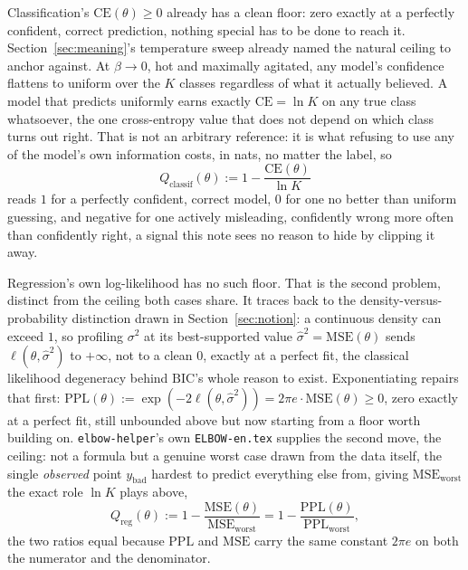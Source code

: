 \documentclass[11pt]{article}
\newcommand{\code}[1]{\texttt{#1}}
\begin{document}
Classification's $\mathrm{CE}(\theta) \ge 0$ already has a clean floor:
zero exactly at a perfectly confident, correct prediction, nothing
special has to be done to reach it. Section~\ref{sec:meaning}'s
temperature sweep already named the natural ceiling to anchor against.
At $\beta \to 0$, hot and maximally agitated, any model's confidence
flattens to uniform over the $K$ classes regardless of what it actually
believed. A model that predicts uniformly earns exactly $\mathrm{CE} =
\ln K$ on any true class whatsoever, the one cross-entropy value that
does not depend on which class turns out right. That is not an
arbitrary reference: it is what refusing to use any of the model's own
information costs, in nats, no matter the label, so
$$Q_{\text{classif}}(\theta) := 1 - \frac{\mathrm{CE}(\theta)}{\ln K}$$
reads $1$ for a perfectly confident, correct model, $0$ for one no
better than uniform guessing, and negative for one actively misleading,
confidently wrong more often than confidently right, a signal this note
sees no reason to hide by clipping it away.

Regression's own log-likelihood has no such floor. That is the second
problem, distinct from the ceiling both cases share. It traces
back to the density-versus-probability distinction drawn in
Section~\ref{sec:notion}: a continuous density can exceed $1$, so
profiling $\sigma^2$ at its best-supported value $\hat\sigma^2 =
\mathrm{MSE}(\theta)$ sends $\ell(\theta,\hat\sigma^2)$ to $+\infty$,
not to a clean $0$, exactly at a perfect fit, the classical likelihood
degeneracy behind $\mathrm{BIC}$'s whole reason to exist.
Exponentiating repairs that first: $\mathrm{PPL}(\theta) :=
\exp(-2\ell(\theta,\hat\sigma^2)) = 2\pi e \cdot \mathrm{MSE}(\theta)
\ge 0$, zero exactly at a perfect fit, still unbounded above but now
starting from a floor worth building on. \code{elbow-helper}'s own
\code{ELBOW-en.tex} supplies the second move, the ceiling: not a
formula but a genuine worst case drawn from the data itself, the
single \emph{observed} point $y_{\text{bad}}$ hardest to predict
everything else from, giving $\mathrm{MSE}_{\text{worst}}$ the exact
role $\ln K$ plays above,
$$Q_{\text{reg}}(\theta) := 1 - \frac{\mathrm{MSE}(\theta)}{\mathrm{MSE}_{\text{worst}}} = 1 - \frac{\mathrm{PPL}(\theta)}{\mathrm{PPL}_{\text{worst}}},$$
the two ratios equal because $\mathrm{PPL}$ and $\mathrm{MSE}$ carry
the same constant $2\pi e$ on both the numerator and the denominator.
\end{document}
